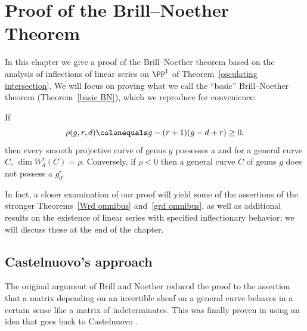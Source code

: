 

\chapter{Proof of the Brill--Noether Theorem}
\label{Brill Noether proof chapter}
\label{BrillNoetherproofChapter}

In this chapter we give a proof of the Brill--Noether
theorem based on the analysis
of inflections of linear series on $\PP^{1}$ of
Theorem~\ref{osculating intersection}. We will focus on proving what
we call the ``basic'' Brill--Noether theorem (Theorem~\ref{basic BN}),
which we reproduce for convenience: 

\begin{theorem}\label{BN-basic}
If 
 $$
 \rho(g,r,d) \colonequals  g - (r+1)(g-d+r) \geq 0,
$$
then every smooth projective curve of genus $g$  possesses a 
%
and for a general curve $C$,  $\dim W^r_d(C) = \rho$. Conversely, if
$\rho < 0$ then a general curve $C$ of genus $g$ does not possess a $g^r_d$. 
\unif
\end{theorem}

In fact, a closer examination of our proof will yield some of the
assertions of the stronger Theorems~\ref{Wrd omnibus} 
and~\ref{grd omnibus}, as well as additional results on the existence of
linear series with specified inflectionary behavior; we will discuss these at
the end of the chapter.

\section{Castelnuovo's approach}

The original argument of Brill and Noether reduced the proof to the
assertion that a matrix depending
on an invertible sheaf on a general curve
%
behaves in a certain sense like a matrix of indeterminates. This was
finally proven in \cite{Griffiths-Harris-BN} using an idea that goes
%
back to Castelnuovo \citeyear{zbMATH02692307}.


